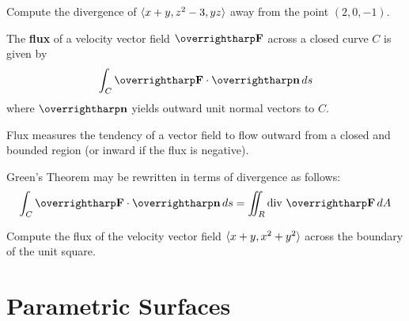 \documentclass[letterpaper, twoside, 12pt]{book}
\begin{document}
          \begin{problem}
            Compute the divergence of $\langle x+y,z^2-3,yz\rangle$ away from the point
            $(2,0,-1)$.
          \end{problem}

          \begin{solution}

          \end{solution}

          \begin{contributors}

          \end{contributors}

\begin{definition}
  The \textbf{flux} of a velocity vector field $\vect{F}$ across a closed
  curve $C$ is given by
  \[
    \int_C \vect{F}\cdot\vect{n}\dvar{s}
  \]
  where $\vect n$ yields outward unit normal vectors to $C$.
\end{definition}

\begin{remark}
  Flux measures the tendency of a vector field to flow outward from
  a closed and bounded region (or inward if the flux is negative).
\end{remark}

\begin{theorem}
  Green's Theorem may be rewritten in terms of divergence as follows:
  \[
    \int_C \vect{F}\cdot\vect{n}\dvar{s}
      =
    \iint_R \text{div }\vect{F} \dvar{A}
  \]
\end{theorem}

          \begin{problem}
            Compute the flux of the velocity vector field
            $\langle x+y,x^2+y^2\rangle$ across the boundary of the unit square.
          \end{problem}

          \begin{solution}

          \end{solution}

          \begin{contributors}

          \end{contributors}

\section{Parametric Surfaces} %
\end{document}

